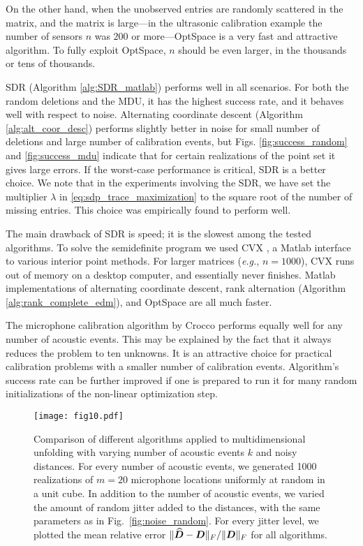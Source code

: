 \documentclass[10pt,double]{IEEEtran}
\providecommand{\wh}[1]{\ensuremath{\widehat{#1}}}
\newcommand{\rev}[1]{{#1}}
\begin{document}
{On the other hand, when the unobserved entries are randomly scattered in the
matrix, and the matrix is large---in the ultrasonic calibration example the
number of sensors $n$ was $200$ or more---OptSpace is a very fast and
attractive algorithm. To fully exploit OptSpace, $n$ should be even larger, in
the thousands or tens of thousands.

SDR (Algorithm \ref{alg:SDR_matlab}) performs well in all scenarios. For both
the random deletions and the MDU, it has the highest success rate, and it
behaves well with respect to noise. Alternating coordinate descent (Algorithm
\ref{alg:alt_coor_desc}) performs slightly better in noise for small number of
deletions and large number of calibration events, but Figs.
\ref{fig:success_random} and \ref{fig:success_mdu} indicate that for certain
realizations of the point set it gives large errors. If the worst-case
performance is critical, SDR is a better choice. We note that in the
experiments involving the SDR, we have set the multiplier $\lambda$ in
\ref{eq:sdp_trace_maximization} to the square root of the number of missing
entries. This choice was empirically found to perform well.

The main drawback of SDR is speed; it is the slowest among the tested
algorithms. To solve the semidefinite program we used CVX \cite{cvx,gb08}, a
Matlab interface to various interior point methods. For larger matrices
(\emph{e.g.}, $n = 1000$), CVX runs out of memory on a desktop computer, and
essentially never finishes. Matlab implementations of alternating coordinate
descent, rank alternation (Algorithm \ref{alg:rank_complete_edm}), and
OptSpace are all much faster.

The microphone calibration algorithm by Crocco \cite{Crocco:2012eu} performs
equally well for any number of acoustic events. This may be explained by the
fact that it always reduces the problem to ten unknowns. It is an attractive
choice for practical calibration problems with a smaller number of calibration
events. Algorithm's success rate can be further improved if one is prepared to
run it for many random initializations of the non-linear
optimization step.

\begin{figure}[t!]
\centering
\texttt{[image: fig10.pdf]}
\caption{\rev{Comparison of different algorithms applied to multidimensional
unfolding with varying number of acoustic events $k$ and noisy distances. For
every number of acoustic events, we generated 1000 realizations of $m = 20$
microphone locations uniformly at random in a unit cube. In addition to the
number of acoustic events, we varied the amount of random jitter added to the
distances, with the same parameters as in Fig.~\ref{fig:noise_random}. For
every jitter level, we plotted the mean relative error $\|\wh{\mD} - \mD \|_F /
\|\mD \|_F$ for all algorithms.}}
\label{fig:noise_mdu}
\end{figure}

}
\end{document}
